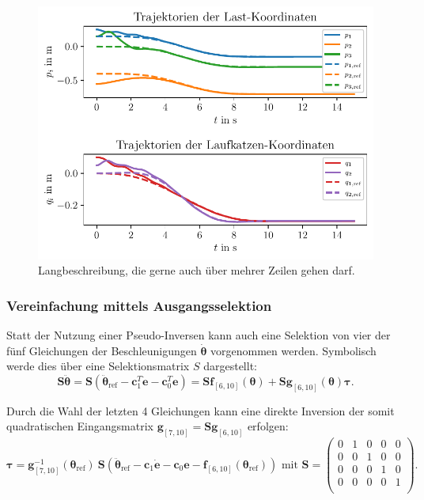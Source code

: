 \begin{figure}[ht]
	\begin{center}
		\includegraphics[scale=1]{Pictures/feedforward_lin_pseudo_controller_initial_error}
	\end{center}
	\caption[Kurzbeschreibung für Abbildungsverzeichnis]
	{Langbeschreibung, die gerne auch über mehrer Zeilen gehen darf.}
	\label{fig_feedforward_pseudo_controller_initial_error}
\end{figure}

\subsubsection{Vereinfachung mittels Ausgangsselektion}
Statt der Nutzung einer Pseudo-Inversen kann auch eine Selektion von vier der fünf Gleichungen der Beschleunigungen $\dot{\mathbf{\theta}}$ vorgenommen werden. Symbolisch werde dies über eine Selektionsmatrix $S$ dargestellt:
\begin{equation}
	\mathbf{S} \ddot{\mathbf{\theta}} = \mathbf{S}(\ddot{\mathbf{\theta}}_{\text{ref}} - \mathbf{c}_1^T \dot{\mathbf{e}} - \mathbf{c}_0^T \mathbf{e}) = \mathbf{S} \mathbf{f}_{[6, 10]}(\mathbf{\theta}) + \mathbf{S} \mathbf{g}_{[6, 10]}(\mathbf{\theta}) \mathbf{\tau}.
\end{equation} 

Durch die Wahl der letzten 4 Gleichungen kann eine direkte Inversion der somit quadratischen Eingangsmatrix $\mathbf{g}_{[7, 10]} = \mathbf{S} \mathbf{g}_{[6, 10]}$ erfolgen:
\begin{equation}
	\mathbf{\tau}= \mathbf{g}^{-1}_{[7, 10]}(\mathbf{\theta}_{\text{ref}}) \ \mathbf{S}(\ddot{\mathbf{\theta}}_{\text{ref}} - \mathbf{c}_{1} \mathbf{\dot{e}} - \mathbf{c}_{0} \mathbf{e} - \mathbf{f}_{[6, 10]}(\mathbf{\theta}_{\text{ref}})) \text{ mit } 
	\mathbf{S} = 
	\begin{pmatrix}
	0 & 1 & 0 & 0 & 0 \\
	0 & 0 & 1 & 0 & 0 \\
	0 & 0 & 0 & 1 & 0 \\
	0 & 0 & 0 & 0 & 1 \\
	\end{pmatrix}.
\end{equation}

